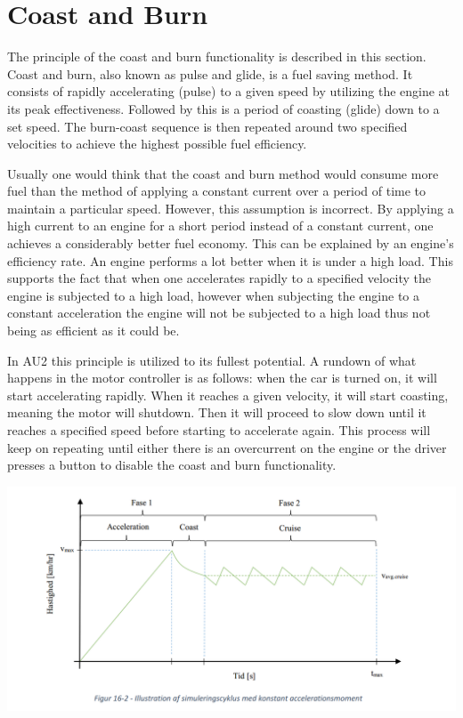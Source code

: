 \section{Coast and Burn}
The principle of the coast and burn functionality is described in this section.
Coast and burn, also known as pulse and glide, is a fuel saving method. It consists of rapidly accelerating (pulse) to a given speed by utilizing the engine at its peak effectiveness. Followed by this is a period of coasting (glide) down to a set speed. The burn-coast sequence is then repeated around two specified velocities to achieve the highest possible fuel efficiency.

Usually one would think that the coast and burn method would consume more fuel than the method of applying a constant current over a period of time to maintain a particular speed. However, this assumption is incorrect. By applying a high current to an engine for a short period instead of a constant current, one achieves a considerably better fuel economy. This can be explained by an engine’s efficiency rate. An engine performs a lot better when it is under a high load. This supports the fact that when one accelerates rapidly to a specified velocity the engine is subjected to a high load, however when subjecting the engine to a constant acceleration the engine will not be subjected to a high load thus not being as efficient as it could be.

In AU2 this principle is utilized to its fullest potential. A rundown of what happens in the motor controller is as follows: when the car is turned on, it will start accelerating rapidly. When it reaches a given velocity, it will start coasting, meaning the motor will shutdown. Then it will proceed to slow down until it reaches a specified speed before starting to accelerate again. This process will keep on repeating until either there is an overcurrent on the engine or the driver presses a button to disable the coast and burn functionality.

\includegraphics[width=1.0\linewidth]{Software/Coastburn.PNG}


